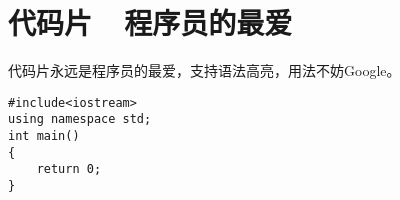 
\section{代码片\ \ 程序员的最爱}
代码片永远是程序员的最爱，支持语法高亮，用法不妨Google。\\
\lstset{language=C}
\begin{lstlisting}
#include<iostream>
using namespace std;
int main()
{
    return 0;
}
\end{lstlisting}


